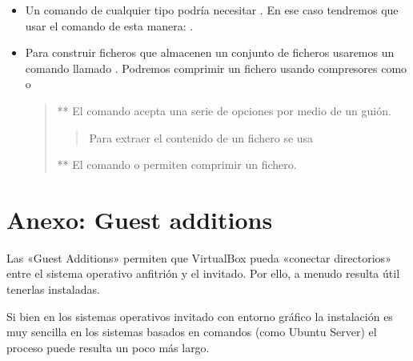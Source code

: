 \documentclass[letterpaper,10pt,spanish]{sphinxmanual}
\begin{document}
\begin{itemize}
\item {} 
Un comando de cualquier tipo podría necesitar . En ese caso tendremos que usar el comando  de esta manera:  .

\item {} 
Para construir ficheros que almacenen un conjunto de ficheros usaremos un comando llamado  . Podremos comprimir un fichero usando compresores como  o 
\begin{quote}

** El comando  acepta una serie de opciones por medio de un guión.
\begin{quote}

 Para extraer el contenido de un fichero se usa 
\end{quote}

** El comando  o  permiten comprimir un fichero.
\end{quote}

\end{itemize}


\section{Anexo: Guest additions}
\label{\detokenize{tema_pautas_seguridad_informatica/tema_pautas_seguridad_informatica:anexo-guest-additions}}
Las «Guest Additions» permiten que VirtualBox pueda «conectar directorios» entre el sistema operativo anfitrión y el invitado. Por ello, a menudo resulta útil tenerlas instaladas.

Si bien en los sistemas operativos invitado con entorno gráfico la instalación es muy sencilla en los sistemas basados en comandos (como Ubuntu Server) el proceso puede resulta un poco más largo.
\end{document}
